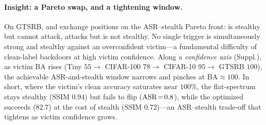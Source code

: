 \paragraph{Insight: a Pareto swap, and a tightening window.}
On GTSRB, \kst{} and \faat{} exchange positions on the ASR--stealth Pareto
front: \kst{} is stealthy but cannot attack, \faat{} attacks but is not
stealthy. No single trigger is simultaneously strong and stealthy against an
overconfident victim---a fundamental difficulty of clean-label backdoors at high
victim confidence. Along a \emph{confidence axis} (Suppl.),
as victim BA rises (Tiny $55 \to$ CIFAR-100 $78 \to$ CIFAR-10 $95 \to$ GTSRB
$100$), the achievable ASR-and-stealth window narrows and pinches at
BA$\approx\!100$. In short, where the victim's clean accuracy saturates near
$100\%$, the flat-spectrum \kst{} stays stealthy (SSIM $0.94$) but fails to flip
($\mathrm{ASR}\!=\!0.8$), while the optimized \faat{} succeeds ($82.7$) at the cost of
stealth (SSIM $0.72$)---an ASR--stealth trade-off that tightens as victim
confidence grows.
